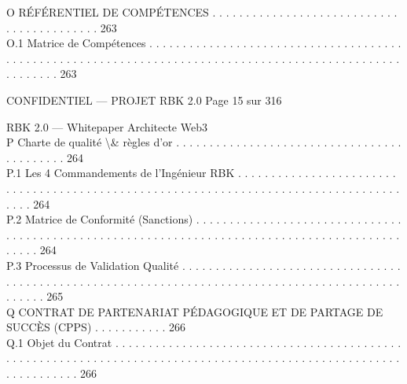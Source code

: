 \documentclass[12pt,landscape,a4paper]{article}
\newenvironment{confidential}
{\begin{tcolorbox}[
    colback=rbkred!5!white,
    colframe=rbkred!75!black,
    title=CONFIDENTIEL,
    fonttitle=\bfseries\color{white},
    coltitle=rbkred!75!black,
    breakable,
    enhanced,
    frame hidden,
    borderline west={2pt}{0pt}{rbkred!75!black}
]}
{\end{tcolorbox}}
\begin{document}
\vspace{0.5em}
O     RÉFÉRENTIEL DE COMPÉTENCES . . . . . . . . . . . . . . . . . . . . . . . . . . . . . . . . . . . . . . . . . . 263\\
O.1     Matrice de Compétences . . . . . . . . . . . . . . . . . . . . . . . . . . . . . . . . . . . . . . . . . . . . . . . . . . . . . . . . . . . . . . . . . . . . . . . . . . . . . . . . . . . . . . . . . . . . . . . . . . . . . . . . . 263\\
\vspace{0.5em}
\vspace{0.5em}
\vspace{0.5em}
\begin{confidential}CONFIDENTIEL — PROJET RBK 2.0                                                                               Page 15 sur 316\end{confidential}
RBK 2.0 — Whitepaper Architecte Web3\\
\vspace{0.5em}
\vspace{0.5em}
P     Charte de qualité \textbackslash{}& règles d’or . . . . . . . . . . . . . . . . . . . . . . . . . . . . . . . . . . . . . . . . . . . 264\\
P.1     Les 4 Commandements de l’Ingénieur RBK . . . . . . . . . . . . . . . . . . . . . . . . . . . . . . . . . . . . . . . . . . . . . . . . . . . . . . . . . . . . . . . . . . . . . . . . . . . . . . . . . . . . . . . 264\\
P.2     Matrice de Conformité (Sanctions) . . . . . . . . . . . . . . . . . . . . . . . . . . . . . . . . . . . . . . . . . . . . . . . . . . . . . . . . . . . . . . . . . . . . . . . . . . . . . . . . . . . . . . . . . . . . . . . 264\\
P.3     Processus de Validation Qualité . . . . . . . . . . . . . . . . . . . . . . . . . . . . . . . . . . . . . . . . . . . . . . . . . . . . . . . . . . . . . . . . . . . . . . . . . . . . . . . . . . . . . . . . . . . . . . . . . . 265\\
\vspace{0.5em}
Q     CONTRAT DE PARTENARIAT PÉDAGOGIQUE ET DE PARTAGE DE SUCCÈS (CPPS) . . . . . . . . . . . 266\\
Q.1     Objet du Contrat . . . . . . . . . . . . . . . . . . . . . . . . . . . . . . . . . . . . . . . . . . . . . . . . . . . . . . . . . . . . . . . . . . . . . . . . . . . . . . . . . . . . . . . . . . . . . . . . . . . . . . . . . . . . . . . . . 266\\
\end{document}
